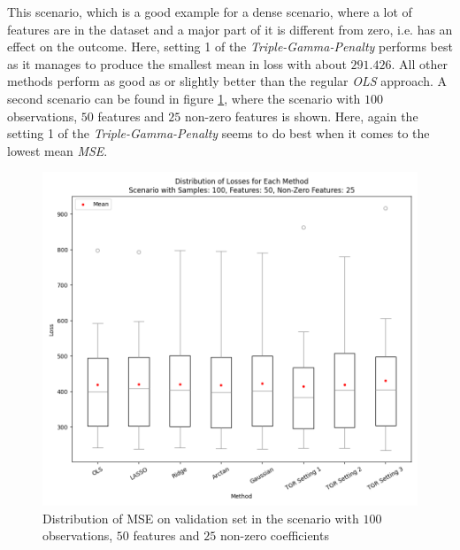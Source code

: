 \documentclass[12pt,a4paper]{article}
\begin{document}
This scenario, which is a good example for a dense scenario, where a lot of features are in the dataset and a major part of it is different from zero, i.e. has an effect on the outcome. Here, setting 1 of the \textit{Triple-Gamma-Penalty} performs best as it manages to produce the smallest mean in loss with about $291.426$. All other methods perform as good as or slightly better than the regular \textit{OLS} approach. A second scenario can be found in figure \ref{fig:SpecificScenario2}, where the scenario with $100$ observations, $50$ features and $25$ non-zero features is shown. Here, again the setting 1 of the \textit{Triple-Gamma-Penalty} seems to do best when it comes to the lowest mean \textit{MSE}.\\ 
\vfill

\begin{figure}[H]
\centering
\includegraphics[scale=0.6]{../02_simulation/021_simulation_figures/Boxplot_Scenario_100_50_25.png}
\caption{Distribution of MSE on validation set in the scenario with $100$ observations, $50$ features and $25$ non-zero coefficients}
\label{fig:SpecificScenario2}
\end{figure} 	
\end{document}
